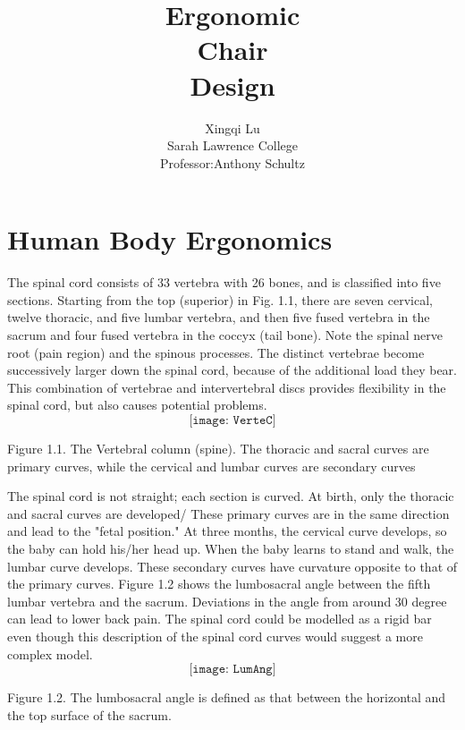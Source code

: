 \documentclass[paper=a4, fontsize=12pt, ]{scrartcl} %
\title{	\fontsize{50}{60}\selectfont
			\vspace*{0.4cm}
			\hfill Ergonomic 	\\[0.1cm]
			\hfill Chair        \\[0.1cm]
            \hfill Design%
		}
\author{
		\hfill Xingqi Lu\\	
		\hfill Sarah Lawrence College\\	
		\hfill Professor:Anthony Schultz\\
}
\numberwithin{equation}{section} %
\numberwithin{figure}{section} %
\numberwithin{table}{section} %
\begin{document}
\maketitle %




\section{Human Body Ergonomics}
  The spinal cord consists of 33 vertebra with 26 bones, and is classified into five sections. Starting from the top (superior) in Fig. 1.1, there are seven cervical, twelve thoracic, and five lumbar vertebra, and then five fused vertebra in the sacrum and four fused vertebra in the coccyx (tail bone). Note the spinal nerve root (pain region) and the spinous processes. The distinct vertebrae become successively larger down the spinal cord, because of the additional load they bear. This combination of vertebrae and intervertebral discs provides flexibility in the spinal cord, but also causes potential problems.
\vspace{1 cm}
$$\texttt{[image: VerteC]}$$
\begin{footnotesize}
Figure 1.1. The Vertebral column (spine). The thoracic and sacral curves are primary curves, while the cervical and lumbar curves are secondary curves
\end{footnotesize}

\vspace{1 cm}
  The spinal cord is not straight; each section is curved. At birth, only the thoracic and sacral curves are developed/ These primary curves are in the same direction and lead to the "fetal position." At three months, the cervical curve develops, so the baby can hold his/her head up. When the baby learns to stand and walk, the lumbar curve develops. These secondary curves have curvature opposite to that of the primary curves. Figure 1.2 shows the lumbosacral angle between the fifth lumbar vertebra and the sacrum. Deviations in the angle from around 30 degree can lead to lower back pain. The spinal cord could be modelled as a rigid bar even though this description of the spinal cord curves would suggest a more complex model.
\vspace{1 cm}
$$\texttt{[image: LumAng]}$$
\begin{footnotesize}
Figure 1.2. The lumbosacral angle is defined as that between the horizontal and the top surface of the sacrum.
\end{footnotesize}
\end{document}
